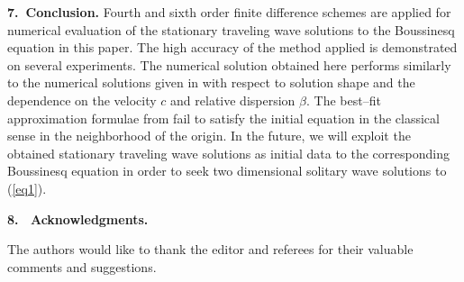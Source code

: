 \documentclass[leqno,11pt]{book}
\newcommand{\rf}[1]{(\ref{#1})}
\newcommand{\sect}[1]{\bigskip \par {\large\bf #1}}
\begin{document}
\bigskip

\sect{7.~Conclusion.}
Fourth and sixth order finite difference schemes are applied for numerical evaluation of the stationary traveling wave solutions to the Boussinesq equation in this paper. The high accuracy of the method applied is demonstrated on several experiments. The numerical solution obtained here performs similarly to the numerical solutions given in \cite{Ch2012,Ch2011} with respect to solution shape and the dependence on the velocity $c$ and relative dispersion $\beta$. 
The best--fit approximation formulae from  \cite{Ch2011} fail to satisfy the initial equation in the classical sense in the neighborhood of the origin. 
In the future, we will exploit the obtained stationary traveling wave solutions as initial data to the corresponding Boussinesq equation in order to seek two dimensional solitary wave solutions to \rf{eq1}.

\bigskip

\sect{8.~ Acknowledgments.}

The authors would like to thank the editor and referees for their valuable comments and suggestions.
\end{document}
